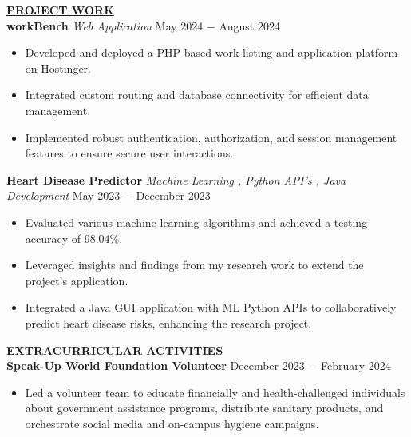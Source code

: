 \documentclass{article}
\begin{document}
%
%
\noindent \textbf{\underline{PROJECT WORK}} \\
\noindent \textbf{workBench} \textit{Web Application} \hfill  May 2024 $-$ August 2024
\begin{itemize}[noitemsep,nolistsep,leftmargin=*]
\item {Developed and deployed a PHP-based work listing and application platform on Hostinger.
}
\item {Integrated custom routing and database connectivity for efficient
data management.
}
\item {Implemented robust authentication, authorization, and session management features to ensure secure user interactions.
\\}
\end{itemize}

\noindent \textbf{Heart Disease Predictor} \textit{Machine Learning , Python API's , Java Development} \hfill  May 2023 $-$ December 2023
\begin{itemize}[noitemsep,nolistsep,leftmargin=*]
\item {Evaluated various machine learning algorithms and achieved a testing accuracy of 98.04\%.}
\item {Leveraged insights and findings from my research work to extend the project's application. }
\item {Integrated a Java GUI application with ML Python APIs to collaboratively predict heart disease risks, enhancing the research project.\\}
\end{itemize}

\noindent \textbf{\underline{EXTRACURRICULAR ACTIVITIES}} \\
\noindent \textbf{Speak-Up World Foundation Volunteer} \hfill December 2023 $-$ February 2024
\begin{itemize}[noitemsep,nolistsep,leftmargin=*]
\item {Led a volunteer team to educate financially and health-challenged individuals about government assistance programs, distribute sanitary products, and orchestrate social media and on-campus hygiene campaigns.\\}
\end{itemize}
\end{document}
